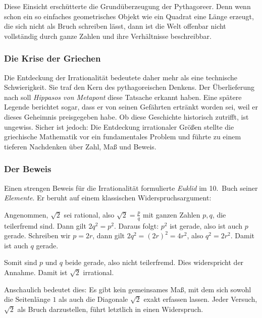 Diese Einsicht erschütterte die Grundüberzeugung der Pythagoreer.
Denn wenn schon ein so einfaches geometrisches Objekt wie ein Quadrat
eine Länge erzeugt, die sich nicht als Bruch schreiben lässt,
dann ist die Welt offenbar nicht vollständig
durch ganze Zahlen und ihre Verhältnisse beschreibbar.

\subsubsection*{Die Krise der Griechen}
Die Entdeckung der Irrationalität bedeutete daher mehr
als eine technische Schwierigkeit.
Sie traf den Kern des pythagoreischen Denkens.
Der Überlieferung nach soll \emph{Hippasos von Metapont}
diese Tatsache erkannt haben.
Eine spätere Legende berichtet sogar,
dass er von seinen Gefährten ertränkt worden sei,
weil er dieses \glqq Geheimnis\grqq{} preisgegeben habe.
Ob diese Geschichte historisch zutrifft, ist ungewiss.
Sicher ist jedoch:
Die Entdeckung irrationaler Größen stellte die griechische Mathematik
vor ein fundamentales Problem
und führte zu einem tieferen Nachdenken über Zahl, Maß und Beweis.
\newpage
\noindent
\subsubsection*{Der Beweis}
Einen strengen Beweis für die Irrationalität formulierte \emph{Euklid}
im 10.~Buch seiner \emph{Elemente}.
Er beruht auf einem klassischen Widerspruchsargument:

\begin{MathBox}
		\label{box:widerspruch}
	Angenommen, $\sqrt{2}$ sei rational, also $\sqrt{2}=\tfrac{p}{q}$ mit
	ganzen Zahlen $p,q$, die teilerfremd sind.
	Dann gilt $2q^2=p^2$.
	Daraus folgt:
	$p^2$ ist gerade, also ist auch $p$ gerade.
	Schreiben wir $p=2r$, dann gilt
	$2q^2=(2r)^2=4r^2$, also $q^2=2r^2$.
	Damit ist auch $q$ gerade.
	
	Somit sind $p$ und $q$ beide gerade,
	also nicht teilerfremd.
	Dies widerspricht der Annahme.
	Damit ist $\sqrt{2}$ irrational.

\end{MathBox}

Anschaulich bedeutet dies:
Es gibt kein gemeinsames Maß,
mit dem sich sowohl die Seitenlänge $1$
als auch die Diagonale $\sqrt{2}$ exakt erfassen lassen.
Jeder Versuch, $\sqrt{2}$ als Bruch darzustellen,
führt letztlich in einen Widerspruch.

